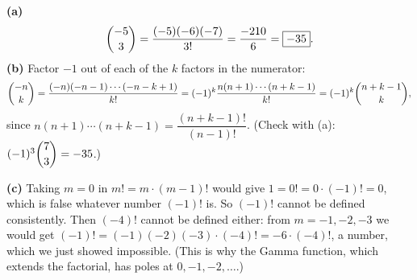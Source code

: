 \textbf{(a)}
\[
\dbinom{-5}{3}=\dfrac{(-5)(-6)(-7)}{3!}=\dfrac{-210}{6}=\boxed{-35}.
\]
\textbf{(b)} Factor $-1$ out of each of the $k$ factors in the numerator:
\[
\dbinom{-n}{k}=\dfrac{(-n)(-n-1)\cdots(-n-k+1)}{k!}=(-1)^k\dfrac{n(n+1)\cdots(n+k-1)}{k!}=(-1)^k\dbinom{n+k-1}{k},
\]
since $n(n+1)\cdots(n+k-1)=\dfrac{(n+k-1)!}{(n-1)!}$. (Check with (a): $(-1)^3\dbinom{7}{3}=-35$.)

\textbf{(c)} Taking $m=0$ in $m!=m\cdot(m-1)!$ would give $1=0!=0\cdot(-1)!=0$, which is false whatever number $(-1)!$ is. So $(-1)!$ cannot be defined consistently. Then $(-4)!$ cannot be defined either: from $m=-1,-2,-3$ we would get $(-1)!=(-1)(-2)(-3)\cdot(-4)!=-6\cdot(-4)!$, a number, which we just showed impossible. (This is why the Gamma function, which extends the factorial, has poles at $0,-1,-2,\dots$.)
